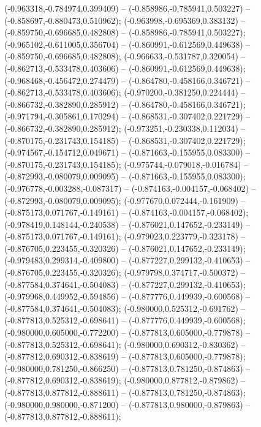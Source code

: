 (-0.963318,-0.784974,0.399409) -- (-0.858986,-0.785941,0.503227) -- (-0.858697,-0.880473,0.510962);
 (-0.963998,-0.695369,0.383132) -- (-0.859750,-0.696685,0.482808) -- (-0.858986,-0.785941,0.503227);
 (-0.965102,-0.611005,0.356704) -- (-0.860991,-0.612569,0.449638) -- (-0.859750,-0.696685,0.482808);
 (-0.966633,-0.531787,0.320054) -- (-0.862713,-0.533478,0.403606) -- (-0.860991,-0.612569,0.449638);
 (-0.968468,-0.456472,0.274479) -- (-0.864780,-0.458166,0.346721) -- (-0.862713,-0.533478,0.403606);
 (-0.970200,-0.381250,0.224444) -- (-0.866732,-0.382890,0.285912) -- (-0.864780,-0.458166,0.346721);
 (-0.971794,-0.305861,0.170294) -- (-0.868531,-0.307402,0.221729) -- (-0.866732,-0.382890,0.285912);
 (-0.973251,-0.230338,0.112034) -- (-0.870175,-0.231743,0.154185) -- (-0.868531,-0.307402,0.221729);
 (-0.974567,-0.154712,0.049671) -- (-0.871663,-0.155955,0.083300) -- (-0.870175,-0.231743,0.154185);
 (-0.975744,-0.079018,-0.016784) -- (-0.872993,-0.080079,0.009095) -- (-0.871663,-0.155955,0.083300);
 (-0.976778,-0.003288,-0.087317) -- (-0.874163,-0.004157,-0.068402) -- (-0.872993,-0.080079,0.009095);
 (-0.977670,0.072444,-0.161909) -- (-0.875173,0.071767,-0.149161) -- (-0.874163,-0.004157,-0.068402);
 (-0.978419,0.148144,-0.240538) -- (-0.876021,0.147652,-0.233149) -- (-0.875173,0.071767,-0.149161);
 (-0.979023,0.223779,-0.323178) -- (-0.876705,0.223455,-0.320326) -- (-0.876021,0.147652,-0.233149);
 (-0.979483,0.299314,-0.409800) -- (-0.877227,0.299132,-0.410653) -- (-0.876705,0.223455,-0.320326);
 (-0.979798,0.374717,-0.500372) -- (-0.877584,0.374641,-0.504083) -- (-0.877227,0.299132,-0.410653);
 (-0.979968,0.449952,-0.594856) -- (-0.877776,0.449939,-0.600568) -- (-0.877584,0.374641,-0.504083);
 (-0.980000,0.525312,-0.691762) -- (-0.877813,0.525312,-0.698641) -- (-0.877776,0.449939,-0.600568);
 (-0.980000,0.605000,-0.772200) -- (-0.877813,0.605000,-0.779878) -- (-0.877813,0.525312,-0.698641);
 (-0.980000,0.690312,-0.830362) -- (-0.877812,0.690312,-0.838619) -- (-0.877813,0.605000,-0.779878);
 (-0.980000,0.781250,-0.866250) -- (-0.877813,0.781250,-0.874863) -- (-0.877812,0.690312,-0.838619);
 (-0.980000,0.877812,-0.879862) -- (-0.877813,0.877812,-0.888611) -- (-0.877813,0.781250,-0.874863);
 (-0.980000,0.980000,-0.871200) -- (-0.877813,0.980000,-0.879863) -- (-0.877813,0.877812,-0.888611);
